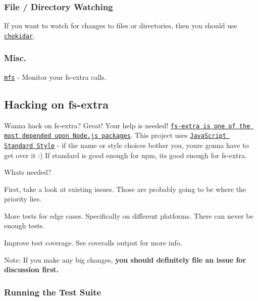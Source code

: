 \subsubsection*{File / Directory Watching}

If you want to watch for changes to files or directories, then you should use \href{https://github.com/paulmillr/chokidar}{\tt chokidar}.

\subsubsection*{Misc.}


\begin{DoxyItemize}
\item \href{https://github.com/cadorn/mfs}{\tt mfs} -\/ Monitor your fs-\/extra calls.
\end{DoxyItemize}

\subsection*{Hacking on fs-\/extra }

Wanna hack on {\ttfamily fs-\/extra}? Great! Your help is needed! \href{http://nodei.co/npm/fs-extra.png?downloads=true&downloadRank=true&stars=true}{\tt fs-\/extra is one of the most depended upon Node.\+js packages}. This project uses \href{https://github.com/feross/standard}{\tt Java\+Script Standard Style} -\/ if the name or style choices bother you, you\textquotesingle{}re gonna have to get over it \+:) If {\ttfamily standard} is good enough for {\ttfamily npm}, it\textquotesingle{}s good enough for {\ttfamily fs-\/extra}.

\href{https://github.com/feross/standard}{\tt }

What\textquotesingle{}s needed?
\begin{DoxyItemize}
\item First, take a look at existing issues. Those are probably going to be where the priority lies.
\item More tests for edge cases. Specifically on different platforms. There can never be enough tests.
\item Improve test coverage. See coveralls output for more info.
\end{DoxyItemize}

Note\+: If you make any big changes, {\bfseries you should definitely file an issue for discussion first.}

\subsubsection*{Running the Test Suite}

